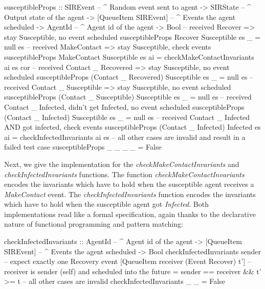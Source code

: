 \begin{HaskellCode}
susceptibleProps :: SIREvent              -- ^ Random event sent to agent
                 -> SIRState              -- ^ Output state of the agent
                 -> [QueueItem SIREvent]  -- ^ Events the agent scheduled
                 -> AgentId               -- ^ Agent id of the agent
                 -> Bool
-- received Recover => stay Susceptible, no event scheduled
susceptibleProps Recover Susceptible es _ = null es
-- received MakeContact => stay Susceptible, check events
susceptibleProps MakeContact Susceptible es ai
  = checkMakeContactInvariants ai es cor 
-- received Contact _ Recovered => stay Susceptible, no event scheduled
susceptibleProps (Contact _ Recovered) Susceptible es _ = null es
-- received Contact _ Susceptible => stay Susceptible, no event scheduled
susceptibleProps (Contact _ Susceptible) Susceptible es _  = null es
-- received Contact _ Infected, didn't get Infected, no event scheduled
susceptibleProps (Contact _ Infected) Susceptible es _ = null es
-- received Contact _ Infected AND got infected, check events
susceptibleProps (Contact _ Infected) Infected es ai
  = checkInfectedInvariants ai es
-- all other cases are invalid and result in a failed test case
susceptibleProps _ _ _ _ = False
\end{HaskellCode}

Next, we give the implementation for the \textit{checkMakeContactInvariants} and \textit{checkInfectedInvariants} functions. The function \textit{checkMakeContactInvariants} encodes the invariants which have to hold when the susceptible agent receives a \textit{MakeContact} event. The \textit{checkInfectedInvariants} function encodes the invariants which have to hold when the susceptible agent got \textit{Infected}. Both implementations read like a formal specification, again thanks to the declarative nature of functional programming and pattern matching:

\begin{HaskellCode}
checkInfectedInvariants :: AgentId              -- ^ Agent id of the agent 
                        -> [QueueItem SIREvent] -- ^ Events the agent scheduled
                        -> Bool
checkInfectedInvariants sender 
  -- expect exactly one Recovery event
  [QueueItem receiver (Event Recover) t'] 
  -- receiver is sender (self) and scheduled into the future
  = sender == receiver && t' >= t 
-- all other cases are invalid
checkInfectedInvariants _ _ = False
\end{HaskellCode}


